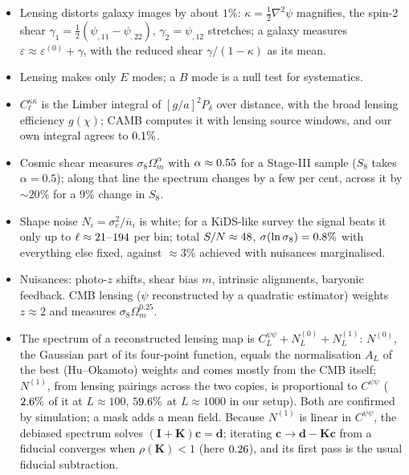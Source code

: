\begin{recap}
\begin{itemize}[leftmargin=1.2em,itemsep=1pt]
\item Lensing distorts galaxy images by about $1\%$: $\kappa=\frac12\nabla^2\psi$ magnifies, the spin-2 shear $\gamma_1=\frac12(\psi_{,11}-\psi_{,22})$, $\gamma_2=\psi_{,12}$ stretches; a galaxy measures $\varepsilon\approx\varepsilon^{(0)}+\gamma$, with the reduced shear $\gamma/(1-\kappa)$ as its mean.
\item Lensing makes only $E$ modes; a $B$ mode is a null test for systematics.
\item $C_\ell^{\kappa\kappa}$ is the Limber integral of $[g/a]^2P_\delta$ over distance, with the broad lensing efficiency $g(\chi)$; CAMB computes it with lensing source windows, and our own integral agrees to $0.1\%$.
\item Cosmic shear measures $\sigma_8\Omega_m^\alpha$ with $\alpha\approx0.55$ for a Stage-III sample ($S_8$ takes $\alpha=0.5$); along that line the spectrum changes by a few per cent, across it by $\sim20\%$ for a $9\%$ change in $S_8$.
\item Shape noise $N_i=\sigma_e^2/\bar n_i$ is white; for a KiDS-like survey the signal beats it only up to $\ell\approx21$--$194$ per bin; total $S/N\approx48$, $\sigma(\ln\sigma_8)=0.8\%$ with everything else fixed, against $\approx3\%$ achieved with nuisances marginalised.
\item Nuisances: photo-$z$ shifts, shear bias $m$, intrinsic alignments, baryonic feedback. CMB lensing ($\psi$ reconstructed by a quadratic estimator) weights $z\approx2$ and measures $\sigma_8\Omega_m^{0.25}$.
\item The spectrum of a reconstructed lensing map is $C^{\psi\psi}_L+N^{(0)}_L+N^{(1)}_L$: $N^{(0)}$, the Gaussian part of its four-point function, equals the normalisation $A_L$ of the best (Hu--Okamoto) weights and comes mostly from the CMB itself; $N^{(1)}$, from lensing pairings across the two copies, is proportional to $C^{\psi\psi}$ ($2.6\%$ of it at $L\approx100$, $59.6\%$ at $L\approx1000$ in our setup). Both are confirmed by simulation; a mask adds a mean field. Because $N^{(1)}$ is linear in $C^{\psi\psi}$, the debiased spectrum solves $(\mathbf I+\mathbf K)\bm c=\bm d$; iterating $\bm c\to\bm d-\mathbf K\bm c$ from a fiducial converges when $\rho(\mathbf K)<1$ (here $0.26$), and its first pass is the usual fiducial subtraction.
\end{itemize}
\end{recap}

